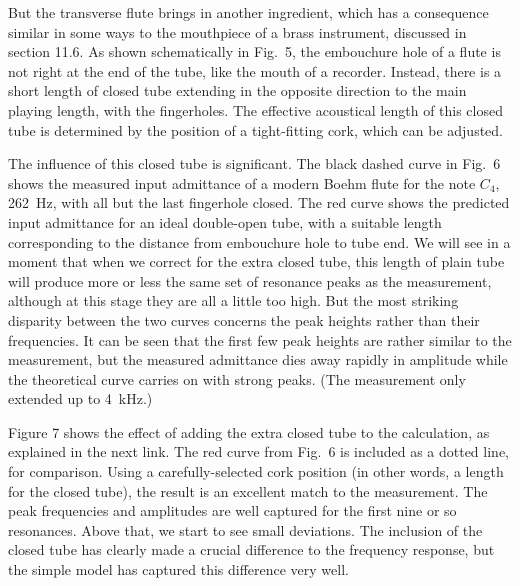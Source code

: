   But the transverse flute brings in another ingredient, which has a 
  consequence similar in some ways to the mouthpiece of a brass instrument, 
  discussed in section 11.6. As shown schematically in Fig.\ 5, the embouchure 
  hole of a flute is not right at the end of the tube, like the mouth of a 
  recorder. Instead, there is a short length of closed tube extending in the 
  opposite direction to the main playing length, with the fingerholes. The 
  effective acoustical length of this closed tube is determined by the position 
  of a tight-fitting cork, which can be adjusted. 


  The influence of this closed tube is significant. The black dashed curve in 
  Fig.\ 6 shows the measured input admittance of a modern Boehm flute for the 
  note $C_4$, 262~Hz, with all but the last fingerhole closed. The red curve 
  shows the predicted input admittance for an ideal double-open tube, with a 
  suitable length corresponding to the distance from embouchure hole to tube 
  end. We will see in a moment that when we correct for the extra closed tube, 
  this length of plain tube will produce more or less the same set of resonance 
  peaks as the measurement, although at this stage they are all a little too 
  high. But the most striking disparity between the two curves concerns the 
  peak heights rather than their frequencies. It can be seen that the first few 
  peak heights are rather similar to the measurement, but the measured 
  admittance dies away rapidly in amplitude while the theoretical curve carries 
  on with strong peaks. (The measurement only extended up to 4~kHz.) 


  Figure 7 shows the effect of adding the extra closed tube to the calculation, 
  as explained in the next link. The red curve from Fig.\ 6 is included as a 
  dotted line, for comparison. Using a carefully-selected cork position (in 
  other words, a length for the closed tube), the result is an excellent match 
  to the measurement. The peak frequencies and amplitudes are well captured for 
  the first nine or so resonances. Above that, we start to see small 
  deviations. The inclusion of the closed tube has clearly made a crucial 
  difference to the frequency response, but the simple model has captured this 
  difference very well. 

